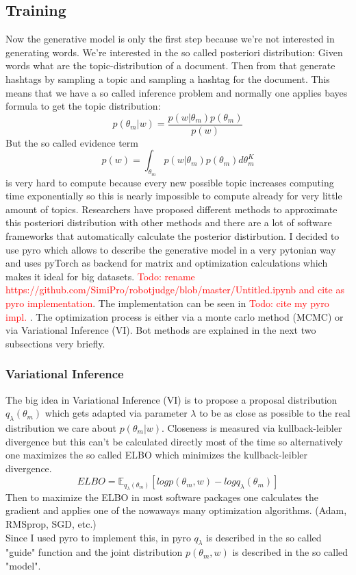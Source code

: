 \documentclass[10pt,conference,compsocconf]{IEEEtran}
\newcommand\todo[1]{\textcolor{red}{Todo: #1}}
\begin{document}
\subsection{Training}
Now the generative model is only the first step because we're not interested in generating words. We're interested in the so called posteriori distribution: Given words what are the topic-distribution of a document. Then from that generate hashtags by sampling a topic and sampling a hashtag for the document. This means that we have a so called inference problem and normally one applies bayes formula to get the topic distribution: \[ p(\theta_m | w) = \frac{p(w | \theta_m)p(\theta_m)}{p(w)} \] But the so called evidence term \[p(w) = \int_{\theta_m} p(w | \theta_m)p(\theta_m) d\theta_m^K \] is very hard to compute because every new possible topic increases computing time exponentially so this is nearly impossible to compute already for very little amount of topics. 
Researchers have proposed different methods to approximate this posteriori distribution with other methods and there are a lot of software frameworks that automatically calculate the posterior distirbution. I decided to use pyro \cite{bingham2018pyro} which allows to describe the generative model in a very pytonian way and uses pyTorch \cite{paszke2017automatic} as backend for matrix and optimization calculations which makes it ideal for big datasets. \todo{rename https://github.com/SimiPro/robotjudge/blob/master/Untitled.ipynb and cite as pyro implementation}. The implementation can be seen in \todo{cite my pyro impl. }.   The optimization process is either via a monte carlo method (MCMC) or via Variational Inference (VI). Bot methods are explained in the next two subsections very briefly. 

\subsubsection{Variational Inference}
The big idea in Variational Inference (VI) is to propose a proposal distribution $q_\lambda(\theta_m)$ which gets adapted via parameter $\lambda$ to be as close as possible to the real distribution we care about $p(\theta_m | w)$. Closeness is measured via kullback-leibler divergence but this can't be calculated directly most of the time so alternatively one maximizes the so called ELBO which minimizes the kullback-leibler divergence. 
\[ ELBO = \mathbb{E}_{q_\lambda(\theta_m)} [log p(\theta_m, w) - log q_{\lambda}(\theta_m)] \]
Then to maximize the ELBO in most software packages one calculates the gradient and applies one of the nowaways many optimization algorithms. (Adam, RMSprop, SGD, etc.)\\
Since I used pyro to implement this, in pyro $q_\lambda$ is described in the so called "guide" function and the joint distribution $p(\theta_m, w)$ is described in the so called "model". 
\end{document}
